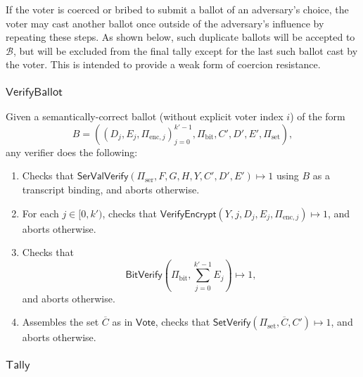 \documentclass{article}
\newcommand{\func}[1]{\mathsf{#1}}
\begin{document}
If the voter is coerced or bribed to submit a ballot of an adversary's choice, the voter may cast another ballot once outside of the adversary's influence by repeating these steps.
As shown below, such duplicate ballots will be accepted to $\mathcal{B}$, but will be excluded from the final tally except for the last such ballot cast by the voter.
This is intended to provide a weak form of coercion resistance.


\subsubsection{\texorpdfstring{$\func{VerifyBallot}$}{VerifyBallot}}

Given a semantically-correct ballot (without explicit voter index $i$) of the form
$$B = \left( (D_j, E_j, \Pi_{\text{enc},j})_{j=0}^{k'-1}, \Pi_{\text{bit}}, C', D', E', \Pi_{\text{set}} \right),$$
any verifier does the following:
\begin{enumerate}
    \item Checks that $\func{SerValVerify}(\Pi_{\text{ser}}, F, G, H, Y, C', D', E') \mapsto 1$ using $B$ as a transcript binding, and aborts otherwise.
    \item For each $j \in [0,k')$, checks that $\func{VerifyEncrypt}(Y, j, D_j, E_j, \Pi_{\text{enc},j}) \mapsto 1$, and aborts otherwise.
    \item Checks that $$\func{BitVerify}\left( \Pi_{\text{bit}}, \sum_{j=0}^{k'-1} E_j \right) \mapsto 1,$$ and aborts otherwise.
    \item Assembles the set $\overline{C}$ as in $\func{Vote}$, checks that $\func{SetVerify}(\Pi_{\text{set}}, \overline{C}, C') \mapsto 1$, and aborts otherwise.
\end{enumerate}


\subsubsection{\texorpdfstring{$\func{Tally}$}{Tally}}
\end{document}
